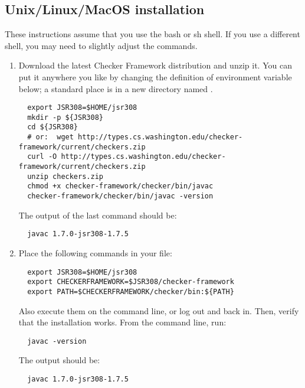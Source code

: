 \subsection{Unix/Linux/MacOS installation\label{unix-installation}}

These instructions assume that you use the bash or sh shell.  If you use a
different shell, you may need to slightly adjust the commands.

\begin{enumerate}

\item
  Download the latest Checker Framework distribution
  and unzip it.  You can put it anywhere you like by changing the
  definition of environment variable  below; a standard place
  is in a
  new directory named .

\begin{Verbatim}
  export JSR308=$HOME/jsr308
  mkdir -p ${JSR308}
  cd ${JSR308}
  # or:  wget http://types.cs.washington.edu/checker-framework/current/checkers.zip
  curl -O http://types.cs.washington.edu/checker-framework/current/checkers.zip
  unzip checkers.zip
  chmod +x checker-framework/checker/bin/javac
  checker-framework/checker/bin/javac -version
\end{Verbatim}

The output of the last command should be:

\begin{Verbatim}
  javac 1.7.0-jsr308-1.7.5
\end{Verbatim}


\item
  Place the following commands in your  file:
\begin{Verbatim}
  export JSR308=$HOME/jsr308
  export CHECKERFRAMEWORK=$JSR308/checker-framework
  export PATH=$CHECKERFRAMEWORK/checker/bin:${PATH}
\end{Verbatim}


Also execute them on the command line, or log out and back in.  Then,
verify that the installation works.  From the command line, run:

\begin{Verbatim}
  javac -version
\end{Verbatim}

The output should be:

\begin{Verbatim}
  javac 1.7.0-jsr308-1.7.5
\end{Verbatim}

\end{enumerate}

